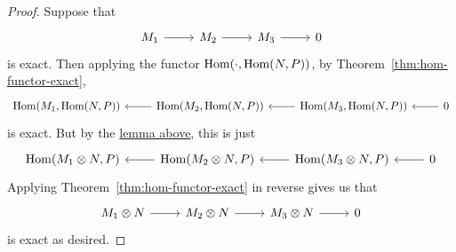\begin{proof}
    Suppose that
    \begin{equation*}
        \begin{tikzcd}
            M_1 \arrow{r} & M_2 \arrow{r} & M_3 \arrow{r} & 0
        \end{tikzcd}
    \end{equation*}
    is exact.
    Then applying the functor \(\operatorname{Hom}(\cdot,\operatorname{Hom}(N,P))\),
    by Theorem~\ref{thm:hom-functor-exact},
    \begin{equation*}
        \begin{tikzcd}
            \Hom(M_1,\Hom(N,P)) & \Hom(M_2,\Hom(N,P)) \arrow{l} & \Hom(M_3,\Hom(N,P)) \arrow{l} & 0 \arrow{l}
        \end{tikzcd}
    \end{equation*}
    is exact.
    But by the \hyperref[lem:tensor-hom-equivalence]{lemma above},
    this is just
    \begin{equation*}
        \begin{tikzcd}
            \Hom(M_1 \otimes N,P) & \Hom(M_2 \otimes N,P) \arrow{l} & \Hom(M_3 \otimes N,P) \arrow{l} & 0 \arrow{l}
        \end{tikzcd}
    \end{equation*}
    Applying Theorem~\ref{thm:hom-functor-exact} in reverse gives us that
    \begin{equation*}
        \begin{tikzcd}
            M_1 \otimes N \arrow{r} & M_2 \otimes N \arrow{r} & M_3 \otimes N \arrow{r} & 0
        \end{tikzcd}
    \end{equation*}
    is exact as desired.
\end{proof}

